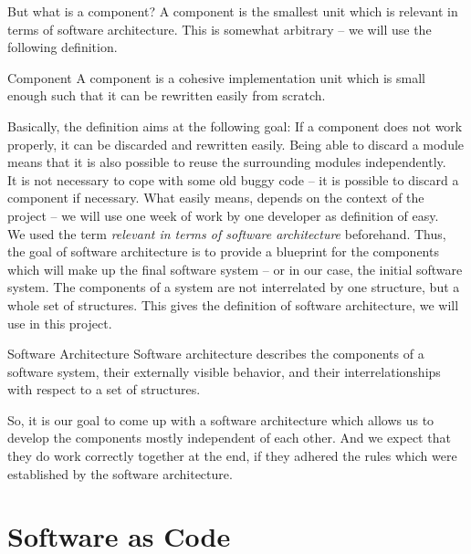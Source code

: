 But what is a component? A component is the smallest unit which is
relevant in terms of software architecture. This is somewhat
arbitrary -- we will use the following definition.
\begin{definition*}{Component}
  A component is a cohesive implementation unit which is small enough
  such that it can be rewritten easily from scratch.
\end{definition*}
%
Basically, the definition aims at the following goal: If a component
does not work properly, it can be discarded and rewritten easily. Being
able to discard a module means that it is also possible to reuse the
surrounding modules independently.\\
%
It is not necessary to cope with some old buggy code -- it is possible
to discard a component if necessary. What easily means, depends on the
context of the project -- we will use one week of work by one
developer as definition of easy.\\
%
%
We used the term \emph{relevant in terms of software architecture}
beforehand. Thus, the goal of software architecture is to provide a
blueprint for the components which will make up the final software
system -- or in our case, the initial software system. The components
of a system are not interrelated by one structure, but a whole set of
structures. This gives the definition of software architecture, we
will use in this project.
%
\begin{definition*}{Software Architecture}
  Software architecture describes the components of a software system,
  their externally visible behavior, and their interrelationships with
  respect to a set of structures.  
\end{definition*}
%
So, it is our goal to come up with a software architecture which
allows us to develop the components mostly independent of each other.
And we expect that they do work correctly together at the end, if they
adhered the rules which were established by the software
architecture.



\section{Software as Code}
\label{sec:software-as-code}

